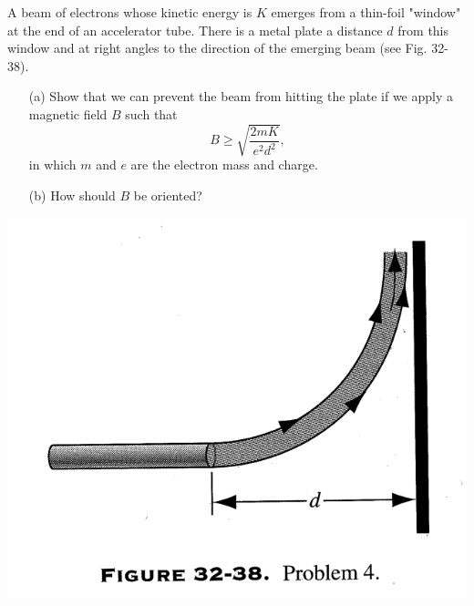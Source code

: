 \documentclass[12pt,letterpaper,boxed,cm]{hmcpset}
\newcommand{\f}[2]{\frac{#1}{#2}}
\begin{document}

\begin{problem}[32-P4]
	A beam of electrons whose kinetic energy is $K$ emerges from a thin-foil "window" at the end of an accelerator tube. There is a metal plate a distance $d$ from this window and at right angles to the direction of the emerging beam (see Fig. 32-38). 
	\begin{enumerate}
		\item[(a)] Show that we can prevent the beam from hitting the plate if we apply a magnetic field $B$ such that 
		\[
			B \ge \sqrt{\f{2mK}{e^2d^2}},
		\]
		in which $m$ and $e$ are the electron mass and charge.
		\item[(b)] How should $B$ be oriented?
	\end{enumerate}
	\begin{center}
		\includegraphics[scale=0.7]{01.png}	
	\end{center}
\end{problem}
\begin{solution}
\end{solution}
\newpage
\end{document}

